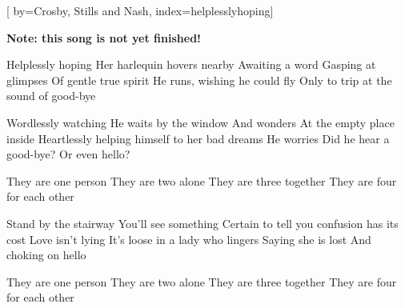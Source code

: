 

[%
    by={Crosby, Stills and Nash},
    index={helplesslyhoping}]


    \label{helplesslyhoping}

    \textbf{Note: this song is not yet finished!}

    \beginverse
        Helplessly hoping
        Her harlequin hovers nearby
        Awaiting a word
        Gasping at glimpses
        Of gentle true spirit
        He runs, wishing he could fly
        Only to trip at the sound of good-bye
    \endverse

    \beginverse
        Wordlessly watching
        He waits by the window
        And wonders
        At the empty place inside
        Heartlessly helping himself to her bad dreams
        He worries
        Did he hear a good-bye? Or even hello?
    \endverse

    \beginchorus
        They are one person
        They are two alone
        They are three together
        They are four for each other
    \endchorus

    \beginverse
        Stand by the stairway
        You'll see something
        Certain to tell you confusion has its cost
        Love isn't lying
        It's loose in a lady who lingers
        Saying she is lost
        And choking on hello
    \endverse

    \beginchorus
        They are one person
        They are two alone
        They are three together
        They are four for each other
    \endchorus
\endsong
